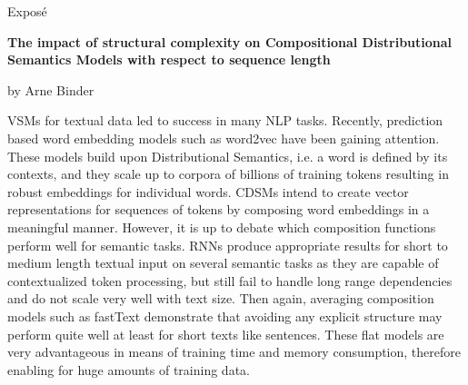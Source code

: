 
\begin{center}
	\huge{Expos\'e} 
	\vspace{0.5cm}
	 
	\large{\bf{The impact of structural complexity on Compositional Distributional Semantics Models %
			with respect to sequence length}} 
	\vspace{0.5cm}

	by Arne Binder \\
\end{center}

\vspace{0.5cm}
\normalsize

\acfp{VSM} for textual data \autocite{salton_vector_1975} led to success in many \ac{NLP} tasks. Recently, prediction based word embedding models such as word2vec \autocite{mikolov_efficient_2013} have been gaining attention. These models build upon Distributional Semantics, i.e. a word is defined by its contexts, and they scale up to corpora of billions of training tokens  \autocite{mikolov_distributed_2013} resulting in robust embeddings for individual words. 
\acfp{CDSM} intend to create vector representations for sequences of tokens by composing word embeddings in a meaningful manner. However, it is up to debate which composition functions perform well for semantic tasks. \acp{RNN} produce appropriate results for short to medium length textual input on several semantic tasks  \autocite{vinyals_show_2014,wu_googles_2016,xiong_microsoft_2017} as they are capable of contextualized token processing, but still fail to handle long range dependencies and do not scale very well with text size. Then again, averaging composition models such as fastText \autocite{joulin_bag_2017} demonstrate that avoiding any explicit structure may perform quite well at least for short texts like sentences. These flat models are very advantageous in means of training time and memory consumption, therefore enabling for huge amounts of training data. 


